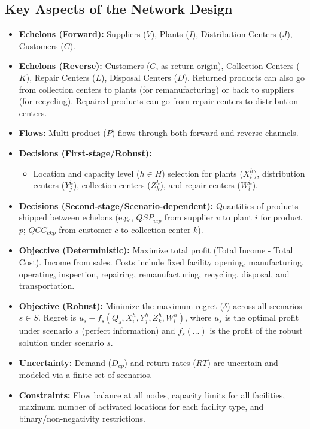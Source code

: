 \subsection*{Key Aspects of the Network Design}
\begin{itemize}
    \item \textbf{Echelons (Forward):} Suppliers ($V$), Plants ($I$), Distribution Centers ($J$), Customers ($C$).
    \item \textbf{Echelons (Reverse):} Customers ($C$, as return origin), Collection Centers ($K$), Repair Centers ($L$), Disposal Centers ($D$). Returned products can also go from collection centers to plants (for remanufacturing) or back to suppliers (for recycling). Repaired products can go from repair centers to distribution centers.
    \item \textbf{Flows:} Multi-product ($P$) flows through both forward and reverse channels.
    \item \textbf{Decisions (First-stage/Robust):}
        \begin{itemize}
            \item Location and capacity level ($h \in H$) selection for plants ($X_i^h$), distribution centers ($Y_j^h$), collection centers ($Z_k^h$), and repair centers ($W_l^h$).
        \end{itemize}
    \item \textbf{Decisions (Second-stage/Scenario-dependent):} Quantities of products shipped between echelons (e.g., $QSP_{vip}$ from supplier $v$ to plant $i$ for product $p$; $QCC_{ckp}$ from customer $c$ to collection center $k$).
    \item \textbf{Objective (Deterministic):} Maximize total profit (Total Income - Total Cost). Income from sales. Costs include fixed facility opening, manufacturing, operating, inspection, repairing, remanufacturing, recycling, disposal, and transportation.
    \item \textbf{Objective (Robust):} Minimize the maximum regret ($\delta$) across all scenarios $s \in S$. Regret is $u_s - f_s(Q_s, X_i^h, Y_j^h, Z_k^h, W_l^h)$, where $u_s$ is the optimal profit under scenario $s$ (perfect information) and $f_s(...)$ is the profit of the robust solution under scenario $s$.
    \item \textbf{Uncertainty:} Demand ($D_{cp}$) and return rates ($RT$) are uncertain and modeled via a finite set of scenarios.
    \item \textbf{Constraints:} Flow balance at all nodes, capacity limits for all facilities, maximum number of activated locations for each facility type, and binary/non-negativity restrictions.
\end{itemize}

